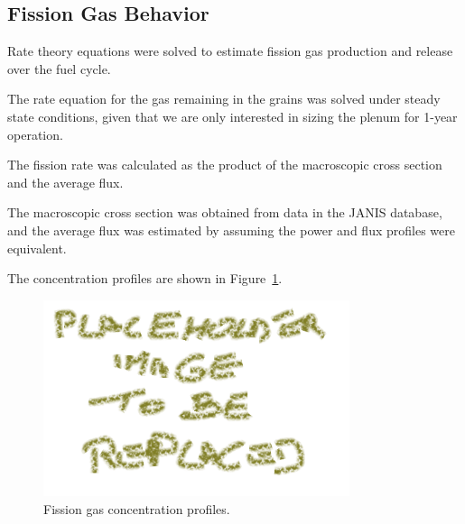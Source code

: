 \subsection{Fission Gas Behavior}
Rate theory equations were solved to estimate fission gas production and release over the fuel cycle.

The rate equation for the gas remaining in the grains was solved under steady state conditions, given that we are only interested in sizing the plenum for 1-year operation.

The fission rate was calculated as the product of the macroscopic cross section and the average flux.

The macroscopic cross section was obtained from data in the JANIS database, and the average flux was estimated by assuming the power and flux profiles were equivalent.

The concentration profiles are shown in Figure~\ref{fig:fission_gas}.

\begin{figure}[H]
\centering
\includegraphics[width=0.8\textwidth]{placeholder.png}
\caption{Fission gas concentration profiles.}
\label{fig:fission_gas}
\end{figure}